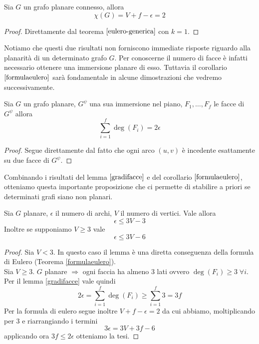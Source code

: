\begin{corollario}\label{formulaeulero}
    Sia \(G\) un grafo planare connesso, allora
    \begin{equation}
        \chi(G)=V+f-\epsilon = 2
    \end{equation}
    \begin{proof}
        Direttamente dal teorema \(\ref{eulero-generica}\) con \(k=1\).
    \end{proof}
\end{corollario}
Notiamo che questi due risultati non forniscono immediate risposte riguardo alla planarità di un determinato grafo \(G\). Per conoscerne il numero di facce è infatti necessario ottenere una immersione planare di esso. Tuttavia il corollario \(\ref{formulaeulero}\) sarà fondamentale in alcune dimostrazioni che vedremo successivamente.
\begin{lemma}\label{gradifacce}
    Sia \(G\) un grafo planare, \(G^\psi\) una sua immersione nel piano, \(F_1, \dots, F_f\) le facce di \(G^\psi\) allora
    \begin{equation}
        \sum_{i=1}^f \deg(F_i) = 2\epsilon
    \end{equation}
    \begin{proof}
        Segue direttamente dal fatto che ogni arco \((u,v)\) è incedente esattamente su due facce di \(G^\psi\).
    \end{proof}
\end{lemma}
Combinando i risultati del lemma \(\ref{gradifacce}\) e del corollario \(\ref{formulaeulero}\), otteniamo questa importante proposizione che ci permette di stabilire a priori se determinati grafi siano non planari.
\begin{proposizione}\label{criterioNonPlan}
    Sia \(G\) planare, \(\epsilon\) il numero di archi, \(V\) il numero di vertici. Vale allora
    \begin{equation}
        \epsilon \leq 3V - 3
    \end{equation}
    Inoltre se supponiamo \(V \geq 3\) vale
    \begin{equation}
        \epsilon \leq 3V - 6
    \end{equation}
    \begin{proof}
        Sia \(V<3\). In questo caso il lemma è una diretta conseguenza della formula di Eulero (Teorema {\ref{formulaeulero}}). \\
        Sia \(V\geq 3\). \(G\) planare \(\Rightarrow\) ogni faccia ha almeno 3 lati ovvero \(\deg(F_i) \geq 3\; \forall i\). Per il lemma {\ref{gradifacce}} vale quindi
        \begin{equation}
            2\epsilon = \sum_{i=1}^f \deg(F_i) \geq \sum_{i=1}^f 3 = 3f
        \end{equation}
        Per la formula di eulero segue inoltre \(V+f-\epsilon = 2\) da cui abbiamo, moltiplicando per 3 e riarrangiando i termini
        \begin{equation}
            3\epsilon = 3V + 3f - 6
        \end{equation}
        applicando ora \(3f\leq 2 \epsilon\) otteniamo la tesi.
    \end{proof}
\end{proposizione}
